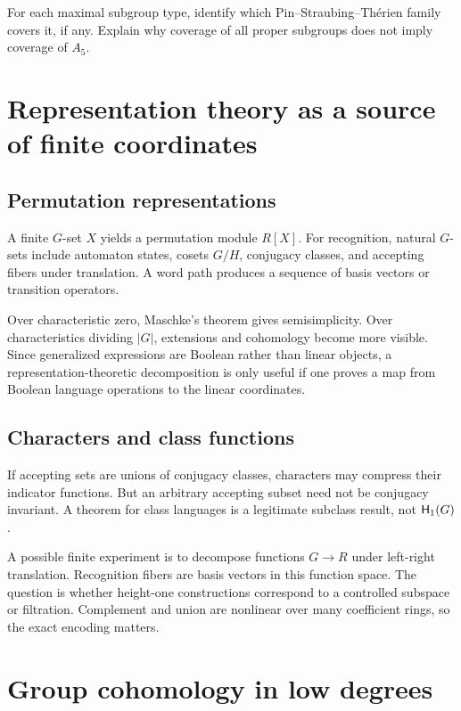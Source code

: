 \documentclass{amsart}
\begin{document}
\begin{exercise}
For each maximal subgroup type, identify which Pin--Straubing--Th\'erien family covers it, if any.  Explain why coverage of all proper subgroups does not imply coverage of $A_5$.
\end{exercise}

\section{Representation theory as a source of finite coordinates}

\subsection{Permutation representations}

A finite $G$-set $X$ yields a permutation module $R[X]$.  For recognition, natural $G$-sets include automaton states, cosets $G/H$, conjugacy classes, and accepting fibers under translation.  A word path produces a sequence of basis vectors or transition operators.

Over characteristic zero, Maschke's theorem gives semisimplicity.  Over characteristics dividing $|G|$, extensions and cohomology become more visible.  Since generalized expressions are Boolean rather than linear objects, a representation-theoretic decomposition is only useful if one proves a map from Boolean language operations to the linear coordinates.

\subsection{Characters and class functions}

If accepting sets are unions of conjugacy classes, characters may compress their indicator functions.  But an arbitrary accepting subset need not be conjugacy invariant.  A theorem for class languages is a legitimate subclass result, not $\mathsf{H}_{1}(G)$.

A possible finite experiment is to decompose functions $G\to R$ under left-right translation.  Recognition fibers are basis vectors in this function space.  The question is whether height-one constructions correspond to a controlled subspace or filtration.  Complement and union are nonlinear over many coefficient rings, so the exact encoding matters.

\section{Group cohomology in low degrees}
\end{document}
